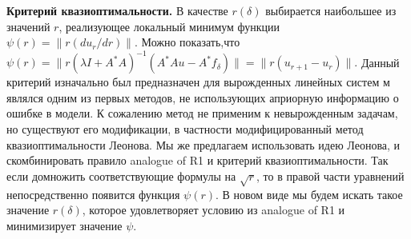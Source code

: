 \documentclass[10pt]{article}
\theoremstyle{definition}
\theoremstyle{remark}
\theoremstyle{plain}
\begin{document}
\textbf{Критерий квазиоптимальности.}
В качестве $r(\delta)$ выбирается наибольшее из значений $r$, реализующее локальный минимум функции $\psi(r) = \|r(du_r/dr)\|$. Можно показать,что $\psi(r) = \|r(\lambda I+A^*A)^{-1}(A^*Au - A^*f_\delta)\| = \|r(u_{r+1} - u_r)\|.$ 
Данный критерий изначально был предназначен для вырожденных линейных систем м являлся одним из первых методов, не использующих априорную информацию о ошибке в модели. К сожалению метод не применим к невырожденным задачам, но существуют его модификации, в частности модифицированный метод квазиоптимальности Леонова. Мы же предлагаем использовать идею Леонова, и скомбинировать правило analogue of R1 и критерий квазиоптимальности. Так если домножить соответствующие формулы на $\sqrt{r}$, то в правой части уравнений непосредственно появится функция $\psi(r)$. В новом виде мы будем искать такое значение $r(\delta)$, которое удовлетворяет условию из analogue of R1 и минимизирует значение $\psi$.


\newpage
\end{document}
